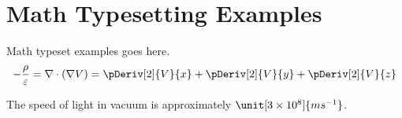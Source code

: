 \appendix
\chapter{Math Typesetting Examples}

Math typeset examples goes here.
\begin{equation}
  - \frac{\rho}{\varepsilon} = \nabla\cdot \left(\nabla V\right) = \pDeriv[2]{V}{x} + \pDeriv[2]{V}{y} + \pDeriv[2]{V}{z}
\end{equation}

The speed of light in vacuum is approximately $\unit[3\times10^8]{m s^{-1}}$.

